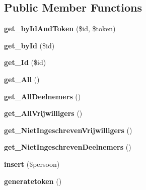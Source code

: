 \subsection*{Public Member Functions}
\begin{DoxyCompactItemize}
\item 
\mbox{\label{class_persoon__model_a4fe7a2f8ac42cd4901ef68b06358d93f}} 
{\bfseries get\+\_\+by\+Id\+And\+Token} (\$id, \$token)
\item 
\mbox{\label{class_persoon__model_a98d28a4d9a29d40c5a8aa0176f19a919}} 
{\bfseries get\+\_\+by\+Id} (\$id)
\item 
\mbox{\label{class_persoon__model_a8d14f8e8d18daadab52042074396a6b8}} 
{\bfseries get\+\_\+\+Id} (\$id)
\item 
\mbox{\label{class_persoon__model_a7e94dd1f7edfacea0d0814ff027b7e04}} 
{\bfseries get\+\_\+\+All} ()
\item 
\mbox{\label{class_persoon__model_a7e0633aa62a76b8fb9bf35c6167a2a0f}} 
{\bfseries get\+\_\+\+All\+Deelnemers} ()
\item 
\mbox{\label{class_persoon__model_a34374012facb64562423057666ed535d}} 
{\bfseries get\+\_\+\+All\+Vrijwilligers} ()
\item 
\mbox{\label{class_persoon__model_ae20838d9cd61c63ac26fdb07f4b7bff4}} 
{\bfseries get\+\_\+\+Niet\+Ingeschreven\+Vrijwilligers} ()
\item 
\mbox{\label{class_persoon__model_a6a34ff3e55e35289c802e4e4ac14792d}} 
{\bfseries get\+\_\+\+Niet\+Ingeschreven\+Deelnemers} ()
\item 
\mbox{\label{class_persoon__model_abb16337bee193e227f25cb9e37ac9394}} 
{\bfseries insert} (\$persoon)
\item 
\mbox{\label{class_persoon__model_a40ea86b0c55c207673f65d23a4a8e98d}} 
{\bfseries generatetoken} ()
\item 
\mbox{\label{class_persoon__model_aad1045b9fabfabcb3090fb0b0b17a6e6}} 

\end{DoxyCompactItemize}
